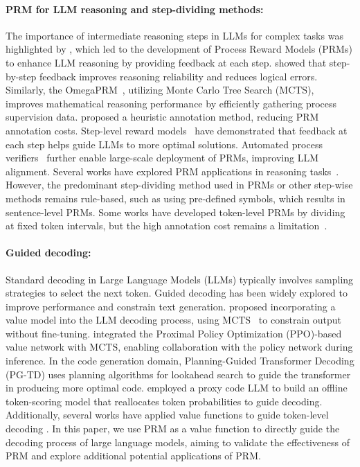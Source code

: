 \paragraph{PRM for LLM reasoning and step-dividing methods:} The importance of intermediate reasoning steps in LLMs for complex tasks was highlighted by \citet{uesato2022solvingmathwordproblems}, which led to the development of Process Reward Models (PRMs) to enhance LLM reasoning by providing feedback at each step. \citet{lightman2023letsverifystepstep} showed that step-by-step feedback improves reasoning reliability and reduces logical errors. Similarly, the OmegaPRM~\cite{luo2024improvemathematicalreasoninglanguage}, utilizing Monte Carlo Tree Search (MCTS), improves mathematical reasoning performance by efficiently gathering process supervision data. \citet{wang2024mathshepherdverifyreinforcellms} proposed a heuristic annotation method, reducing PRM annotation costs. Step-level reward models~\cite{ma2023let} have demonstrated that feedback at each step helps guide LLMs to more optimal solutions. Automated process verifiers~\cite{setlur2024rewardingprogressscalingautomated} further enable large-scale deployment of PRMs, improving LLM alignment. Several works have explored PRM applications in reasoning tasks~\cite{xia2024evaluatingmathematicalreasoningaccuracy, ma2023letsrewardstepstep, luo2023critiqueabilitylargelanguage, snell2024scalingllmtesttimecompute}. However, the predominant step-dividing method used in PRMs or other step-wise methods remains rule-based, such as using pre-defined symbols, which results in sentence-level PRMs. Some works have developed token-level PRMs by dividing at fixed token intervals, but the high annotation cost remains a limitation~\cite{lee2024tokensupervisedvaluemodelsenhancing, luo2024improvemathematicalreasoninglanguage}.


\paragraph{Guided decoding:} Standard decoding in Large Language Models (LLMs) typically involves sampling strategies to select the next token. Guided decoding has been widely explored to improve performance and constrain text generation. \citet{chaffin2022pplmctsconstrainedtextualgeneration} proposed incorporating a value model into the LLM decoding process, using MCTS~\cite{coulom2006efficient} to constrain output without fine-tuning. \citet{liu2024dontthrowawayvalue} integrated the Proximal Policy Optimization (PPO)-based value network with MCTS, enabling collaboration with the policy network during inference. In the code generation domain, Planning-Guided Transformer Decoding (PG-TD)\cite{zhang2023planning} uses planning algorithms for lookahead search to guide the transformer in producing more optimal code. \citet{nie2024decoding} employed a proxy code LLM to build an offline token-scoring model that reallocates token probabilities to guide decoding. Additionally, several works have applied value functions to guide token-level decoding \cite{dathathri2019plug,choi2023kcts,xu2024safedecoding,krause2020gedi}. In this paper, we use PRM as a value function to directly guide the decoding process of large language models, aiming to validate the effectiveness of PRM and explore additional potential applications of PRM.
